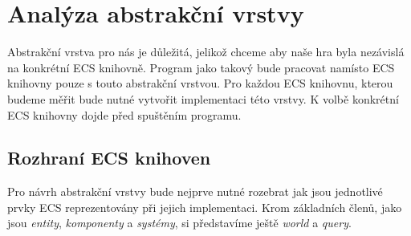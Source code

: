 \section{Analýza abstrakční vrstvy}
\label{section:abstract-layer-analysis}
Abstrakční vrstva pro nás je důležitá, jelikož chceme aby naše hra byla nezávislá na konkrétní ECS knihovně. Program jako takový bude pracovat namísto ECS knihovny pouze s touto abstrakční vrstvou. Pro každou ECS knihovnu, kterou budeme měřit bude nutné vytvořit implementaci této vrstvy. K volbě konkrétní ECS knihovny dojde před spuštěním programu.

\subsection{Rozhraní ECS knihoven}
Pro návrh abstrakční vrstvy bude nejprve nutné rozebrat jak jsou jednotlivé prvky ECS reprezentovány při jejich implementaci. Krom základních členů, jako jsou \textit{entity}, \textit{komponenty} a \textit{systémy}, si představíme ještě \textit{world} a \textit{query}.

